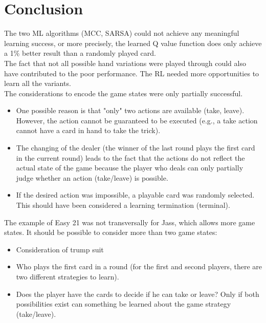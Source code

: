 
\chapter{Conclusion} %

\label{Chapter6} %


The two ML algorithms (MCC, SARSA) could not achieve any  meaningful learning success, or more precisely, the learned Q value function does only achieve a 1\% better result than a randomly played card. \\

The fact that not all possible hand variations were played through could also have contributed to the poor performance. The RL needed more opportunities to learn all the variants. \\

\noindent
The considerations to encode the game states were only partially successful.

\begin{itemize}
    \item One possible reason is that "only" two actions are available (take, leave). However, the action cannot be guaranteed to be executed (e.g., a take action cannot have a card in hand to take the trick).
    \item The changing of the dealer (the winner of the last round plays the first card in the current round) leads to the fact that the actions do not reflect the actual state of the game because the player who deals can only partially judge whether an action (take/leave) is possible.
    \item If the desired action was impossible, a playable card was randomly selected. This should have been considered a learning termination (terminal).
\end{itemize} 


\noindent
The example of Easy 21 was not transversally for Jass, which allows more game states. It should be possible to consider more than two game states:
\begin{itemize}
    \item Consideration of trump suit
    \item Who plays the first card in a round (for the first and second players, there are two different strategies to learn).
    \item Does the player have the cards to decide if he can take or leave? Only if both possibilities exist can something be learned about the game strategy (take/leave).
\end{itemize}

